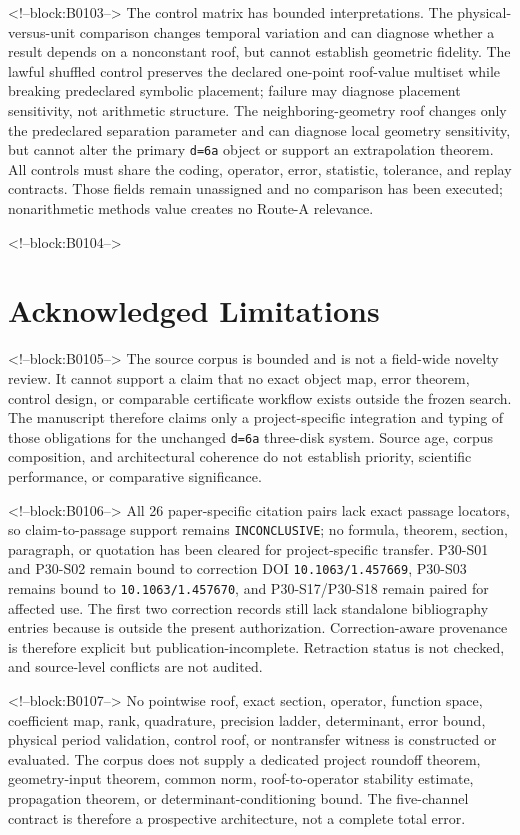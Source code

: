 \documentclass[11pt,a4paper]{article}
\begin{document}
<!--block:B0103-->
The control matrix has bounded interpretations. The physical-versus-unit comparison changes temporal variation and can diagnose whether a result depends on a nonconstant roof, but cannot establish geometric fidelity. The lawful shuffled control preserves the declared one-point roof-value multiset while breaking predeclared symbolic placement; failure may diagnose placement sensitivity, not arithmetic structure. The neighboring-geometry roof changes only the predeclared separation parameter and can diagnose local geometry sensitivity, but cannot alter the primary \texttt{d=6a} object or support an extrapolation theorem. All controls must share the coding, operator, error, statistic, tolerance, and replay contracts. Those fields remain unassigned and no comparison has been executed; nonarithmetic methods value creates no Route-A relevance.

<!--block:B0104-->
\section{Acknowledged Limitations}

<!--block:B0105-->
The source corpus is bounded and is not a field-wide novelty review. It cannot support a claim that no exact object map, error theorem, control design, or comparable certificate workflow exists outside the frozen search. The manuscript therefore claims only a project-specific integration and typing of those obligations for the unchanged \texttt{d=6a} three-disk system. Source age, corpus composition, and architectural coherence do not establish priority, scientific performance, or comparative significance.

<!--block:B0106-->
All 26 paper-specific citation pairs lack exact passage locators, so claim-to-passage support remains \texttt{INCONCLUSIVE}; no formula, theorem, section, paragraph, or quotation has been cleared for project-specific transfer. P30-S01 and P30-S02 remain bound to correction DOI \texttt{10.1063/1.457669}, P30-S03 remains bound to \texttt{10.1063/1.457670}, and P30-S17/P30-S18 remain paired for affected use. The first two correction records still lack standalone bibliography entries because  is outside the present authorization. Correction-aware provenance is therefore explicit but publication-incomplete. Retraction status is not checked, and source-level conflicts are not audited.

<!--block:B0107-->
No pointwise roof, exact section, operator, function space, coefficient map, rank, quadrature, precision ladder, determinant, error bound, physical period validation, control roof, or nontransfer witness is constructed or evaluated. The corpus does not supply a dedicated project roundoff theorem, geometry-input theorem, common norm, roof-to-operator stability estimate, propagation theorem, or determinant-conditioning bound. The five-channel contract is therefore a prospective architecture, not a complete total error.
\end{document}

